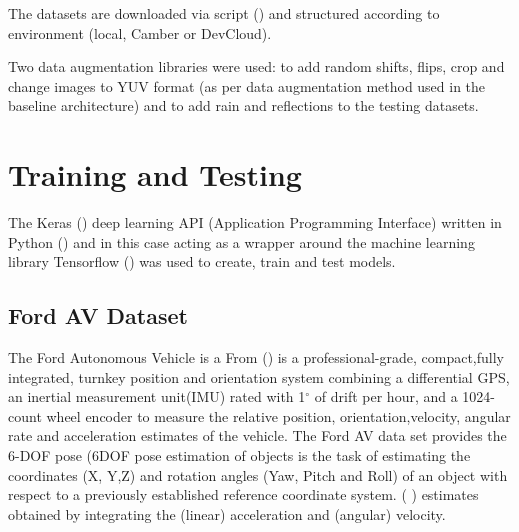 The datasets are downloaded via script (\cite{Sikar2020}) and structured according to environment (local, Camber or DevCloud).

Two data augmentation libraries were used: \cite{Naoki2016} to add random shifts, flips, crop and change images to YUV format (as per \cite{bojarski2016end} data augmentation method used in the baseline architecture) and \cite{Saxena2017} to add rain and reflections to the testing datasets.

\section{Training and Testing}

The Keras (\cite{chollet2015keras}) deep learning API (Application Programming Interface) written in Python (\cite{van1995python}) and in this case acting as a wrapper around the machine learning library Tensorflow (\cite{abadi2016tensorflow})  was used to create, train and test models.

\subsection{Ford AV Dataset}
The Ford Autonomous Vehicle is a 
From %
 (\cite{Applanix}) is a professional-grade, compact,fully  integrated,  turnkey  position  and  orientation  system combining a differential GPS, an inertial measurement unit(IMU)  rated  with  1$^{\circ}$ of  drift  per  hour,  and  a  1024-count wheel encoder to measure the relative position, orientation,velocity,  angular  rate  and  acceleration  estimates  of  the vehicle. The Ford AV data set provides the 6-DOF pose (6DOF pose estimation of objects is the task of estimating the coordinates (X, Y,Z) and rotation angles (Yaw, Pitch and Roll) of an object with respect to a previously established reference coordinate system. (\cite{7005077} ) estimates obtained by integrating the (linear) acceleration and (angular) velocity.


